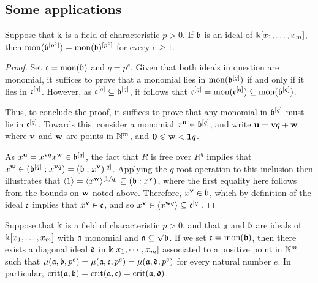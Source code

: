 \documentclass[11pt]{amsart}
\begin{document}
\subsection{Some applications}


\begin{lemma} \label{frobenius-powers+mon-commute: L}
Suppose that $\Bbbk$ is a field of characteristic $p>0$.  If $\mathfrak{b}$ is an ideal of $\Bbbk[x_1, \ldots, x_m]$, then $\operatorname{mon}(\mathfrak{b}^{[p^e]}) = \operatorname{mon}(\mathfrak{b})^{[p^e]}$ for every $e \geq 1$.
\end{lemma}

\begin{proof}  Set $\mathfrak{c} = \operatorname{mon}(\mathfrak{b})$ and $q=p^e$.  Given that both ideals in question are monomial, it suffices to prove that a monomial lies in $\operatorname{mon}(\mathfrak{b}^{[q]})$ if and only if it lies in $\mathfrak{c}^{[q]}$.  However, as $\mathfrak{c}^{[q]} \subseteq \mathfrak{b}^{[q]}$, it follows that
$\mathfrak{c}^{[q]} = \operatorname{mon}(\mathfrak{c}^{[q]}) \subseteq \operatorname{mon}(\mathfrak{b}^{[q]})$.

Thus, to conclude the proof, it suffices to prove that any monomial in $\mathfrak{b}^{[q]}$ must lie in $\mathfrak{c}^{[q]}$.  Towards this, consider a monomial $x^{\mathbf{u}} \in \mathfrak{b}^{[q]}$, and write $\mathbf{u} = \mathbf{v}q + \mathbf{w}$ where $\mathbf{v}$ and $\mathbf{w}$ are points in $\mathbb{N}^m$, and $\mathbf{0} \leqslant \mathbf{w} < \mathbf{1}q$.

As $x^{\mathbf{u}} = x^{\mathbf{v}q} x^{\mathbf{w}} \in \mathfrak{b}^{[q]}$, the fact that $R$ is free over $R^q$ implies that $x^{\mathbf{w}} \in ( \mathfrak{b}^{[q]}: x^{\mathbf{v}q}) = (\mathfrak{b}:x^{\mathbf{v}})^{[q]}$.  Applying the $q$-root operation to this inclusion then illustrates that $\langle 1 \rangle = \langle x^{\mathbf{w}} \rangle^{[1/q]}  \subseteq (\mathfrak{b}: x^{\mathbf{v}})$,  where the first equality here follows from the bounds on $\mathbf{w}$ noted above.   Therefore, $x^{\mathbf{v}} \in \mathfrak{b}$, which by definition of the ideal $\mathfrak{c}$ implies that $x^{\mathbf{v}} \in \mathfrak{c}$, and so $x^{\mathbf{v}} \in \langle x^{\mathbf{w}q} \rangle \subseteq \mathfrak{c}^{[q]}$.
\end{proof}


\begin{corollary}
\label{reduce-to-monomial-case: C}
Suppose that $\Bbbk$ is a field of characteristic $p>0$, and that $\mathfrak{a}$ and $\mathfrak{b}$ are ideals of $\Bbbk[x_1, \ldots, x_m]$ with $\mathfrak{a}$ monomial and $\mathfrak{a} \subseteq \sqrt{\mathfrak{b}}$.  If we set $\mathfrak{c} = \operatorname{mon}(\mathfrak{b})$,  then there exists a diagonal ideal $\mathfrak{d}$ in $\Bbbk[x_1, \cdots, x_m]$ associated to a positive point in $\mathbb{N}^m$ such that $\mu(\mathfrak{a}, \mathfrak{b}, p^e) = \mu(\mathfrak{a}, \mathfrak{c}, p^e) = \mu(\mathfrak{a}, \mathfrak{d}, p^e)$ for every natural number $e$.  In particular, $\operatorname{crit}(\mathfrak{a},\mathfrak{b}) = \operatorname{crit}(\mathfrak{a}, \mathfrak{c}) = \operatorname{crit}(\mathfrak{a}, \mathfrak{d})$.
\end{corollary}
\end{document}
